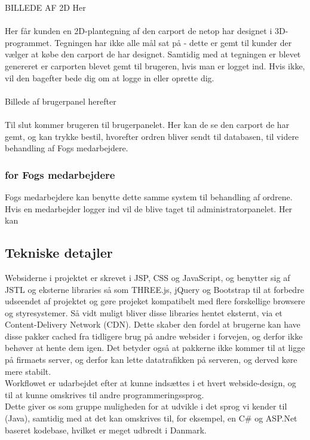BILLEDE AF 2D Her
\\\\
Her får kunden en 2D-plantegning af den carport de netop har designet i 3D-programmet. Tegningen har ikke alle mål sat på - dette er gemt til kunder der vælger at købe den carport de har designet. Samtidig med at tegningen er blevet genereret er carporten blevet gemt til brugeren, hvis man er logget ind. Hvis ikke, vil den bagefter bede dig om at logge in eller oprette dig.
\\\\
Billede af brugerpanel herefter
\\\\
Til slut kommer brugeren til brugerpanelet. Her kan de se den carport de har gemt, og kan trykke bestil, hvorefter ordren bliver sendt til databasen, til videre behandling af Fogs medarbejdere.

\subsubsection{for Fogs medarbejdere}
Fogs medarbejdere kan benytte dette samme system til behandling af ordrene. Hvis en medarbejder logger ind vil de blive taget til administratorpanelet. Her kan

\subsection{Tekniske detajler}
Websiderne i projektet er skrevet i JSP, CSS og JavaScript, og benytter sig af JSTL og eksterne libraries så som THREE.js, jQuery og Bootstrap til at forbedre udseendet af projektet og gøre projeket kompatibelt med flere forskellige browsere og styresystemer. Så vidt muligt bliver disse libraries hentet eksternt, via et Content-Delivery Network (CDN). Dette skaber den fordel at brugerne kan have disse pakker cached fra tidligere brug på andre websider i forvejen, og derfor ikke behøver at hente dem igen. Det betyder også at pakkerne ikke kommer til at ligge på firmaets server, og derfor kan lette datatrafikken på serveren, og derved køre mere stabilt.\\
Workflowet er udarbejdet efter at kunne indsættes i et hvert webside-design, og til at kunne omskrives til andre programmeringssprog.\\
Dette giver os som gruppe muligheden for at udvikle i det sprog vi kender til (Java), samtidig med at det kan omskrives til, for eksempel, en C\# og ASP.Net baseret kodebase, hvilket er meget udbredt i Danmark.